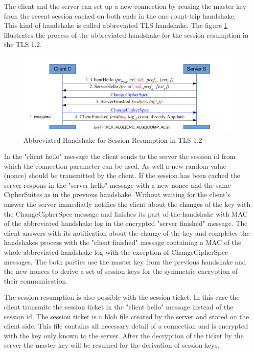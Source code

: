 The client and the server can set up a new connection by reusing the master key from the recent session cached on both ends in the one rount-trip handshake. This kind of handshake is called abbreviated TLS handshake. The figure \ref{fig:resumption1_2} illustrates the process of the abbreviated handshake for the session resumption in the TLS 1.2.

\begin{figure}[H]
	\centering
		\includegraphics[scale=0.85]{images/resumption1_2.png}
	\caption{Abbreviated Handshake for Session Resumption in TLS 1.2 \cite{Hassenstein}}
	\label{fig:resumption1_2}
\end{figure}

In the "client hello" message the client sends to the server the session id from which the connection parameter can be used. As well a new random value (nonce) should be transmitted by the client. If the session has been cached the server respons in the "server hello" message with a new nonce and the same CipherSuites as in the previous handshake. Without waiting for the client's answer the server immediatly notifies the client about the changes of the key with the ChangeCipherSpec message and finishes its part of the handshake with MAC of the abbreviated handshake log in the encrypted "server finished" message. The client answers with its notification about the change of the key and completes the handshakes process with the "client finished" message containing a MAC of the whole abbreviated handshake log with the exception of ChangeCipherSpec messages. The both parties use the master key from the previous handshake and the new nonces to derive a set of session keys for the symmetric encryption of their communication.

The session resumption is also possible with the session ticket. In this case the client transmits the session ticket in the "client hello" message instead of the session id. The session ticket is a blob file created by the server and stored on the client side. This file contains all necessary detail of a connection and is encrypted with the key only known to the server. After the decryption of the ticket by the server the master key will be resumed for the derivation of session keys.

